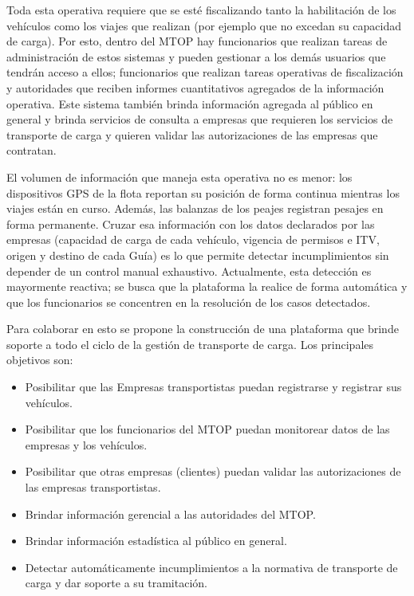 Toda esta operativa requiere que se esté fiscalizando tanto la habilitación de los vehículos como los viajes que realizan (por ejemplo que no excedan su capacidad de carga). Por esto, dentro del MTOP hay funcionarios que realizan tareas de administración de estos sistemas y pueden gestionar a los demás usuarios que tendrán acceso a ellos; funcionarios que realizan tareas operativas de fiscalización y autoridades que reciben informes cuantitativos agregados de la información operativa. Este sistema también brinda información agregada al público en general y brinda servicios de consulta a empresas que requieren los servicios de transporte de carga y quieren validar las autorizaciones de las empresas que contratan.

El volumen de información que maneja esta operativa no es menor: los dispositivos GPS de la flota reportan su posición de forma continua mientras los viajes están en curso. Además, las balanzas de los peajes registran pesajes en forma permanente. Cruzar esa información con los datos declarados por las empresas (capacidad de carga de cada vehículo, vigencia de permisos e ITV, origen y destino de cada Guía) es lo que permite detectar incumplimientos sin depender de un control manual exhaustivo. Actualmente, esta detección es mayormente reactiva; se busca que la plataforma la realice de forma automática y que los funcionarios se concentren en la resolución de los casos detectados.

Para colaborar en esto se propone la construcción de una plataforma que brinde soporte a todo el ciclo de la gestión de transporte de carga. Los principales objetivos son:

\begin{itemize}
    \item Posibilitar que las Empresas transportistas puedan registrarse y registrar sus vehículos.
    \item Posibilitar que los funcionarios del MTOP puedan monitorear datos de las empresas y los vehículos.
    \item Posibilitar que otras empresas (clientes) puedan validar las autorizaciones de las empresas transportistas.
    \item Brindar información gerencial a las autoridades del MTOP.
    \item Brindar información estadística al público en general.
    \item Detectar automáticamente incumplimientos a la normativa de transporte de carga y dar soporte a su tramitación.
\end{itemize}

